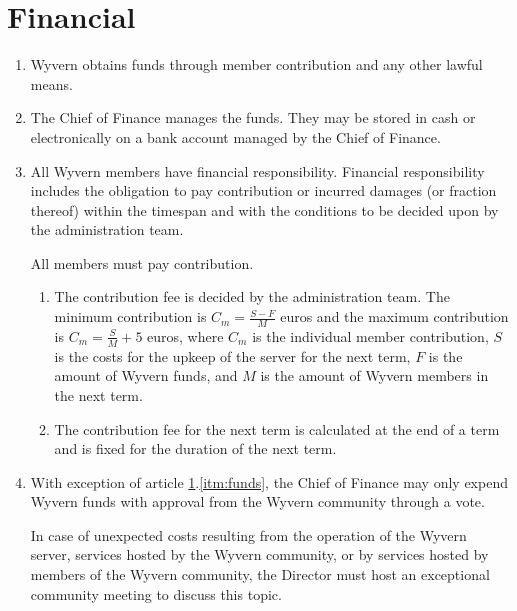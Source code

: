 \section{Financial}
\label{sec:financial}

\begin{enumerate}
    \item Wyvern obtains funds through member contribution and any other lawful means.

    \item The Chief of Finance manages the funds. They may be stored in cash or electronically on a bank account managed by the Chief of Finance.

    \item All Wyvern members have financial responsibility. Financial responsibility includes the obligation to pay contribution or incurred damages (or fraction thereof) within the timespan and with the conditions to be decided upon by the administration team.

    \begin{item}
        All members must pay contribution.
        \begin{enumerate}
            \item The contribution fee is decided by the administration team. The minimum contribution is $C_m = \frac{S-F}{M}$ euros and the maximum contribution is $C_m = \frac{S}{M} + 5$ euros, where $C_m$ is the individual member contribution, $S$ is the costs for the upkeep of the server for the next term, $F$ is the amount of Wyvern funds, and $M$ is the amount of Wyvern members in the next term.
            \item The contribution fee for the next term is calculated at the end of a term and is fixed for the duration of the next term.
        \end{enumerate}
    \end{item}

    \item With exception of article \ref{sec:financial}.\ref{itm:funds}, the Chief of Finance may only expend Wyvern funds with approval from the Wyvern community through a vote.

    \begin{item}
         In case of unexpected costs resulting from the operation of the Wyvern server, services hosted by the Wyvern community, or by services hosted by members of the Wyvern community, the Director must host an exceptional community meeting to discuss this topic.
        

\end{item}
\end{enumerate}
